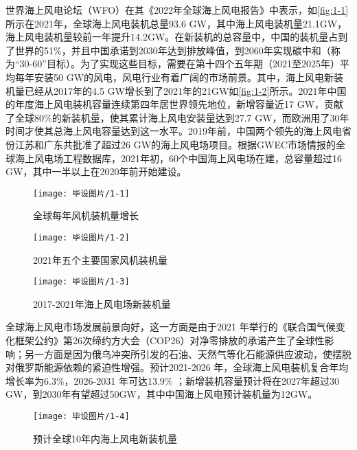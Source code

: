 世界海上风电论坛（WFO）在其《2022年全球海上风电报告》\cite{Council}中表示，如\autoref{fig:1-1}所示在2021年，全球海上风电装机总量93.6 GW，其中海上风电装机量21.1GW，海上风电装机量较前一年提升14.2GW。在新装机的总容量中，中国的装机量占到了世界的51\%，并且中国承诺到2030年达到排放峰值，到2060年实现碳中和（称为“30-60”目标）。为了实现这些目标，需要在第十四个五年期（2021至2025年）平均每年安装50 GW的风电，风电行业有着广阔的市场前景。其中，海上风电新装机量已经从2017年的4.5 GW增长到了2021年的21GW如\autoref{fig:1-2}所示。2021年中国的年度海上风电装机容量连续第四年居世界领先地位，新增容量近17 GW\cite{克拉克森}，贡献了全球80\%的新装机量，使其累计海上风电安装量达到27.7 GW，而欧洲用了30年时间才使其总海上风电容量达到这一水平。2019年前，中国两个领先的海上风电省份江苏和广东共批准了超过26 GW的海上风电场项目。根据GWEC市场情报的全球海上风电场工程数据库，2021年初，60个中国海上风电场在建，总容量超过16 GW，其中一半以上在2020年前开始建设\cite{Ryser}。
\begin{figure}[H]
    \centering
    \begin{minipage}[t]{0.52\textwidth}
    \centering
    \texttt{[image: 毕设图片/1-1]}
    \caption{\label{fig:1-1}全球每年风机装机量增长\cite{Council}}
    \end{minipage}
    \begin{minipage}[t]{0.46\textwidth}
    \centering
    \texttt{[image: 毕设图片/1-2]}
    \caption{\label{fig:1-2}2021年五个主要国家风机装机量\cite{Council}}
    \end{minipage}
\end{figure}
\begin{figure}[htbp]
    \centering
    \texttt{[image: 毕设图片/1-3]}
    \caption{\label{fig:1-3}2017-2021年海上风电场新装机量\cite{Council}}
\end{figure}

全球海上风电市场发展前景向好，这一方面是由于2021 年举行的《联合国气候变化框架公约》第26次缔约方大会（COP26）对净零排放的承诺产生了全球性影响；另一方面是因为俄乌冲突所引发的石油、天然气等化石能源供应波动，使摆脱对俄罗斯能源依赖的紧迫性增强。预计2021-2026 年，全球海上风电装机复合年均增长率为6.3\%，2026-2031 年可达13.9\% ；新增装机容量预计将在2027年超过30 GW，到2030年有望超过50GW\cite{Ryser}，其中中国海上风电预计装机量为12GW。
\begin{figure}[htbp]
    \centering
    \texttt{[image: 毕设图片/1-4]}
    \caption{\label{fig:1-4}预计全球10年内海上风电新装机量\cite{Council}}
\end{figure}

